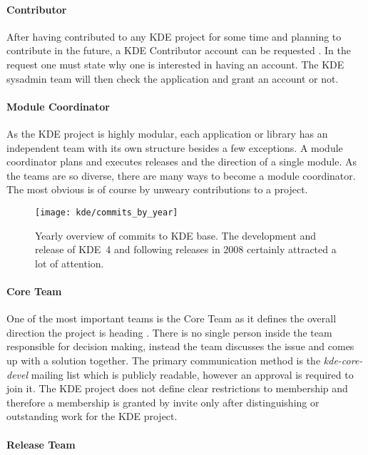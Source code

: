 \paragraph{Contributor}

After having contributed to any KDE project for some time and planning to
contribute in the future, a KDE Contributor account can be requested
\cite{KDEContribute,KDEContributor}. In the request one must state why one is
interested in having an account. The KDE sysadmin team will then check the
application and grant an account or not.

\paragraph{Module Coordinator}

As the KDE project is highly modular, each application or library has an
independent team with its own structure besides a few exceptions. A module
coordinator plans and executes releases and the direction of a single module.
As the teams are so diverse, there are many ways to become a module
coordinator. The most obvious is of course by unweary contributions to a
project.

\begin{figure}[htbp]
  \centering
  \texttt{[image: kde/commits\_by\_year]}
  \caption[Commits by year, KDE]
  {Yearly overview of commits to KDE base. The development and release of KDE~4
    and following releases in 2008 certainly attracted a lot of attention.}
\end{figure}

\paragraph{Core Team}

One of the most important teams is the Core Team as it defines the overall
direction the project is heading \cite{KDEProjectManagement}. There is no
single person inside the team responsible for decision making, instead the team
discusses the issue and comes up with a solution together. The primary
communication method is the \emph{kde-core-devel} mailing list which is
publicly readable, however an approval is required to join it. The KDE project
does not define clear restrictions to membership and therefore a membership is
granted by invite only after distinguishing or outstanding work for the KDE
project.

\paragraph{Release Team}


